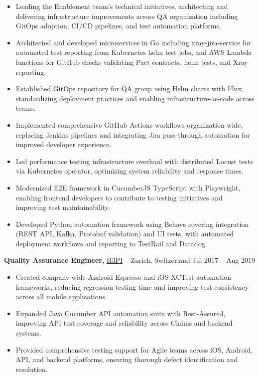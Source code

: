 \documentclass[11pt]{article}       %
\begin{document}
\begin{itemize}
    \item Leading the Enablement team's technical initiatives, architecting and delivering infrastructure improvements across QA organization including GitOps adoption, CI/CD pipelines, and test automation platforms.
    \item Architected and developed microservices in Go including xray-jira-service for automated test reporting from Kubernetes helm test jobs, and AWS Lambda functions for GitHub checks validating Pact contracts, helm tests, and Xray reporting.
    \item Established GitOps repository for QA group using Helm charts with Flux, standardizing deployment practices and enabling infrastructure-as-code across teams.
    \item Implemented comprehensive GitHub Actions workflows organization-wide, replacing Jenkins pipelines and integrating Jira pass-through automation for improved developer experience.
    \item Led performance testing infrastructure overhaul with distributed Locust tests via Kubernetes operator, optimizing system reliability and response times.
    \item Modernized E2E framework in CucumberJS TypeScript with Playwright, enabling frontend developers to contribute to testing initiatives and improving test maintainability.
    \item Developed Python automation framework using Behave covering integration (REST API, Kafka, Protobuf validation) and UI tests, with automated deployment workflows and reporting to TestRail and Datadog.
\end{itemize}

\textbf{Quality Assurance Engineer,} \href{https://www.solera.com/}{R3PI} -- Zurich, Switzerland \hfill Jul 2017 – Aug 2019
\vspace{-9pt}

\begin{itemize}
    \item Created company-wide Android Espresso and iOS XCTest automation frameworks, reducing regression testing time and improving test consistency across all mobile applications.
    \item Expanded Java Cucumber API automation suite with Rest-Assured, improving API test coverage and reliability across Claims and backend systems.
    \item Provided comprehensive testing support for Agile teams across iOS, Android, API, and backend platforms, ensuring thorough defect identification and resolution.
\end{itemize}
\end{document}
